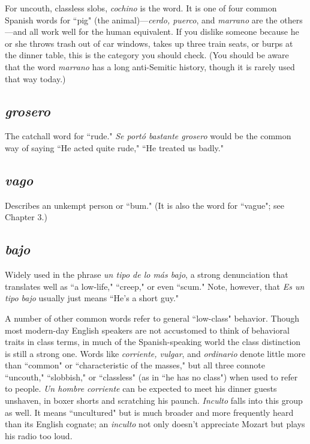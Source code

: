 For uncouth, classless slobs, \emph{cochino} is the word. It is one of
four common Spanish words for ``pig" (the animal)---\emph{cerdo, puerco},
and \emph{marrano} are the others---and all work well for the human equivalent. If you dislike someone because he or she throws trash out of car
windows, takes up three train seats, or burps at the dinner table, this is
the category you should check. (You should be aware that the word
\emph{marrano} has a long anti-Semitic history, though it is rarely used that
way today.)

\subsection{\emph{grosero}}

The catchall word for ``rude." \emph{Se portó bastante
grosero} would be the common way of saying ``He acted quite rude,"
``He treated us badly."

\subsection{\emph{vago}}

Describes an unkempt person or ``bum." (It is also the
word for ``vague"; see Chapter 3.)

\subsection{\emph{bajo}}

Widely used in the phrase \emph{un tipo de lo más bajo}, a
strong denunciation that translates well as ``a low-life," ``creep," or
even ``scum." Note, however, that \emph{Es un tipo bajo} usually just means
``He's a short guy."

\bsk

A number of other common words refer to general ``low-class"
behavior. Though most modern-day English speakers are not accustomed to think of behavioral traits in class terms, in much of the
Spanish-speaking world the class distinction is still a strong one.
Words like \emph{corriente, vulgar}, and \emph{ordinario} denote little more than
``common" or ``characteristic of the masses," but all three connote
``uncouth," ``slobbish," or ``classless" (as in ``he has no class") when
used to refer to people. \emph{Un hombre corriente} can be expected to meet
his dinner guests unshaven, in boxer shorts and scratching his paunch.
\emph{Inculto} falls into this group as well. It means ``uncultured" but is
much broader and more frequently heard than its English cognate; an
\emph{inculto} not only doesn't appreciate Mozart but plays his radio too loud.

